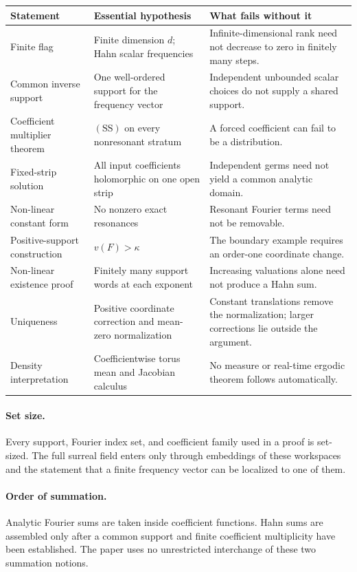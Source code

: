 \documentclass[11pt,letterpaper]{article}
\theoremstyle{definition}
\theoremstyle{remark}
\newcommand{\SDcond}{\mathrm{SS}}
\numberwithin{equation}{section}
\begin{document}
\begin{center}
\small
\begin{tabular}{@{}p{}p{}p{}@{}}
\toprule
Statement & Essential hypothesis & What fails without it\\
\midrule
Finite flag & Finite dimension $d$; Hahn scalar frequencies & Infinite-dimensional rank need not decrease to zero in finitely many steps.\\[4pt]
Common inverse support & One well-ordered support for the frequency vector & Independent unbounded scalar choices do not supply a shared support.\\[4pt]
Coefficient multiplier theorem & $(\SDcond)$ on every nonresonant stratum & A forced coefficient can fail to be a distribution.\\[4pt]
Fixed-strip solution & All input coefficients holomorphic on one open strip & Independent germs need not yield a common analytic domain.\\[4pt]
Non-linear constant form & No nonzero exact resonances & Resonant Fourier terms need not be removable.\\[4pt]
Positive-support construction & $v(F)>\kappa$ & The boundary example requires an order-one coordinate change.\\[4pt]
Non-linear existence proof & Finitely many support words at each exponent & Increasing valuations alone need not produce a Hahn sum.\\[4pt]
Uniqueness & Positive coordinate correction and mean-zero normalization & Constant translations remove the normalization; larger corrections lie outside the argument.\\[4pt]
Density interpretation & Coefficientwise torus mean and Jacobian calculus & No measure or real-time ergodic theorem follows automatically.\\
\bottomrule
\end{tabular}
\end{center}

\paragraph{Set size.}
Every support, Fourier index set, and coefficient family used in a proof is
set-sized.  The full surreal field enters only through embeddings of these
workspaces and the statement that a finite frequency vector can be
localized to one of them.

\paragraph{Order of summation.}
Analytic Fourier sums are taken inside coefficient functions.  Hahn sums
are assembled only after a common support and finite coefficient
multiplicity have been established.  The paper uses no unrestricted
interchange of these two summation notions.
\end{document}
